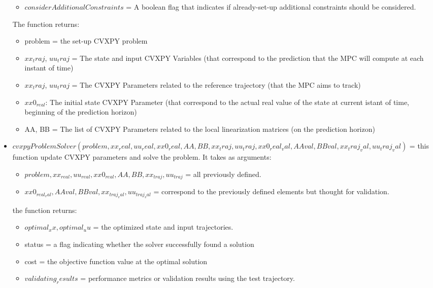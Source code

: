 \documentclass[a4paper,11pt,oneside]{book}
\begin{document}
\begin{itemize}
\begin{itemize}
        \item $considerAdditionalConstraints$ =  A boolean flag that indicates if already-set-up additional constraints should be considered.
    \end{itemize}
    The function returns:
    \begin{itemize}
        \item problem = the set-up CVXPY problem
        \item $xx_traj$, $uu_traj$ = The state and input CVXPY Variables (that correspond to the prediction that the MPC will compute at each instant of time)
        \item $xx_traj$, $uu_traj$ = The CVXPY Parameters related to the reference trajectory (that the MPC aims to track)
        \item $xx0_{real}$: The initial state CVXPY Parameter (that correspond to the actual real value of the state at current istant of time, beginning of the prediction horizon)
        \item AA, BB = The list of CVXPY Parameters related to the local linearization matrices (on the prediction horizon)
    \end{itemize}
    \item  $cvxpyProblemSolver(problem, xx_real, uu_real, xx0_real, AA, BB, xx_traj, uu_traj, xx0_real_val, AAval, BBval, xx_traj_val, uu_traj_val)$ = this function update CVXPY parameters and solve the problem. It takes as arguments:
    \begin{itemize}
        \item $problem, xx_{real}, uu_{real}, xx0_{real}, AA, BB,xx_{traj}, uu_{traj}$ = all previously defined.
        \item $xx0_{real_val}, AAval, BBval, xx_{traj_val}, uu_{traj_val}$ = correspond to the previously defined elements but thought for validation.
    \end{itemize}
    the function returns:
    \begin{itemize}
        \item $optimal_xx, optimal_uu$ = the optimized state and input trajectories.
        \item status = a flag indicating whether the solver successfully found a solution 
        \item cost = the objective function value at the optimal solution
        \item $validating_results$ = performance metrics or validation results using the test trajectory.
    \end{itemize}
\end{itemize}
\end{document}
